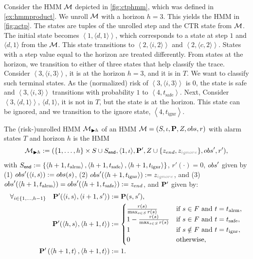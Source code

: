 \documentclass[runningheads]{llncs}
\newcommand{\Obs}{Z}
\newcommand{\actps}[3]{\left\langle #1, \langle #2, #3\rangle \right\rangle}
\newcommand{\talrm}{t_{\text{alrm}}}
\newcommand{\tsafe}{t_{\text{safe}}}
\newcommand{\tig}{t_{\text{ignr}}}
\newcommand{\ig}{z_{\color{gray} ignore}\xspace}
\newcommand{\en}{z_{\color{black} end}\xspace}
\newcommand{\alarms}[1][h+1]{\left\langle #1, \talrm\right\rangle}
\newcommand{\safes}[1][h+1]{\left\langle #1, \tsafe\right\rangle}
\newcommand{\igs}[1][h+1]{\left\langle #1, \tig\right\rangle}
\newcommand{\defeq}{:=}
\begin{document}
\begin{example}
    \label{ex:actp}
    Consider the HMM $\mathcal{M}$ depicted in \cref{fig:ctphmm}, which was defined in \cref{ex:hmmproduct}. We unroll $\mathcal{M}$ with a horizon $h=3$. This yields the HMM in \cref{fig:actp}.
    The states are tuples of the unrolled step and the CTR state from $\mathcal{M}$.
    The initial state becomes $\actps{1}{d}{1}$, which corresponds to a state at step $1$ and $\langle d,1 \rangle$ from the $\mathcal{M}$. This state transitions to $\actps{2}{i}{2}$ and $\actps{2}{c}{2}$.
    States with a step value equal to the horizon are treated differently. From states at the horizon, we transition to either of three states that help classify the trace.
    Consider $\actps{3}{i}{3}$, it is at the horizon $h=3$, and it is in $T$.
    We want to classify such terminal states. As the (normalized) risk of $\actps{3}{i}{3}$ is $0$, the state is safe and $\actps{3}{i}{3}$ transitions with probability $1$ to $\safes[4]$. Next, Consider $\actps{3}{d}{1}$, $\langle d, 1\rangle$, it is not in $T$, but the state is at the horizon. This state can be ignored, and we transition to the ignore state, $\igs[4]$.
\end{example}


\begin{definition}
    \label{def:acyclichmm}
    The (risk-)unrolled HMM $\mathcal{M}_{\blacktriangleright h}$ of an HMM $\mc = \left(\Sts, \init, \ptrans, \Obs, \obsf, r \right)$ with alarm states $T$ and horizon $h$ is the HMM \[ \mc_{\blacktriangleright h} \defeq (\{1,\hdots,h\} \times \Sts \cup \Sts_{\mathsf{end}}, \langle 1,\init\rangle, \ptrans', \Obs \cup \{\en, \ig\}, \obsf', r'),\] with $\Sts_{\mathsf{end}} \defeq  \{ \alarms, \safes, \igs \}$, $r'(\cdot) = 0$,
    ${obs}'$ given by (1) $\obsf'(\langle i, s\rangle) \defeq \obsf(s)$, \quad(2) $\obsf'(\igs) \defeq \ig$, \quad and (3) $\obsf'(\alarms) = \obsf'(\safes) \defeq \en$,
    and $\mathbf{P}'$ given by:
    \begin{align*}
        \forall_{i\in\{1,\ldots,h-1\}}\quad \ptrans'(\langle i, s\rangle, \langle i+1, s'\rangle) & \defeq \ptrans(s,s'), \\
        \ptrans'(\langle h, s\rangle,\left\langle h+1, t\right\rangle)                            & \defeq
        \begin{cases}
            \frac{r(s)}{\max_{s\in\Sts} r(s)}     & \text{if } s \in F \text{ and } t = \talrm,  \\
            1 - \frac{r(s)}{\max_{s\in\Sts} r(s)} & \text{if } s \in F \text{ and } t = \tsafe,  \\
            1                                     & \text{if } s \notin F \text{ and } t = \tig, \\
            0                                     & \text{otherwise,}
        \end{cases}                      \\
        \ptrans'\left(\left\langle h+1, t\right\rangle, \left\langle h+1, t\right\rangle\right)   & \defeq 1.
    \end{align*}
\end{definition}
\end{document}
